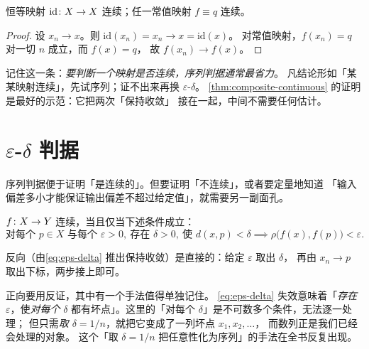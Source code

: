 \begin{proposition}
  \label{prop:id-const-continuous}
  恒等映射 \(\mathrm{id} \colon X \to X\) 连续；任一常值映射
  \(f \equiv q\) 连续。
\end{proposition}

\begin{proof}
  设 \(x_{n} \to x\)。则 \(\mathrm{id}(x_{n}) = x_{n} \to x = \mathrm{id}(x)\)。
  对常值映射，\(f(x_{n}) = q\) 对一切 \(n\) 成立，而 \(f(x) = q\)，
  故 \(f(x_{n}) \to f(x)\)。
\end{proof}

\begin{remark}
  记住这一条：\emph{要判断一个映射是否连续，序列判据通常最省力}。
  凡结论形如「某某映射连续」，先试序列；证不出来再换 \(\varepsilon\)-\(\delta\)。
  \cref{thm:composite-continuous} 的证明是最好的示范：它把两次「保持收敛」
  接在一起，中间不需要任何估计。
\end{remark}

\section{\texorpdfstring{\(\varepsilon\)-\(\delta\)}{ε-δ} 判据}
\label{sec:eps-delta}

序列判据便于证明「是连续的」。但要证明「不连续」，或者要定量地知道
「输入偏差多小才能保证输出偏差不超过给定值」，就需要另一副面孔。

\begin{theorem}
  \label{thm:eps-delta}
  \(f \colon X \to Y\) 连续，当且仅当下述条件成立：
  \begin{equation}
    \label{eq:eps-delta}
    \text{对每个 } p \in X \text{ 与每个 } \varepsilon > 0,\
    \text{存在 } \delta > 0,\ \text{使 } d(x,p) < \delta
    \implies \rho\bigl(f(x), f(p)\bigr) < \varepsilon .
  \end{equation}
\end{theorem}

\begin{strategy}
  反向（由\cref{eq:eps-delta} 推出保持收敛）是直接的：给定 \(\varepsilon\) 取出 \(\delta\)，
  再由 \(x_{n} \to p\) 取出下标，两步接上即可。

  正向要用反证，其中有一个手法值得单独记住。
  \cref{eq:eps-delta} 失效意味着「\emph{存在} \(\varepsilon\)，使\emph{对每个} \(\delta\)
  都有坏点」。这里的「对每个 \(\delta\)」是不可数多个条件，无法逐一处理；
  但只需\emph{取 \(\delta = 1/n\)}，就把它变成了一列坏点 \(x_{1}, x_{2}, \dots\)，
  而数列正是我们已经会处理的对象。
  这个「取 \(\delta = 1/n\) 把任意性化为序列」的手法在全书反复出现。
\end{strategy}

